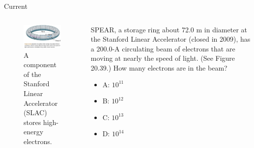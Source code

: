 \documentclass{beamer}
\begin{document}
\begin{frame}{Current}
\begin{columns}[T]
\begin{column}{0.5\textwidth}
\begin{figure}
\centering
\includegraphics[width=\textwidth]{figures/SPEAR.png}
\caption{\label{fig:SLAC} A component of the Stanford Linear Accelerator (SLAC) stores high-energy electrons.}
\end{figure}
\end{column}
\begin{column}{0.5\textwidth}
\small
SPEAR, a storage ring about 72.0 m in diameter at the Stanford Linear Accelerator (closed in 2009), has a 200.0-A circulating beam of electrons that are moving at nearly the speed of light. (See Figure 20.39.) How many electrons are in the beam?
\begin{itemize}
\item A: $10^{11}$
\item B: $10^{12}$
\item C: $10^{13}$
\item D: $10^{14}$
\end{itemize}
\end{column}
\end{columns}
\end{frame}
\end{document}
